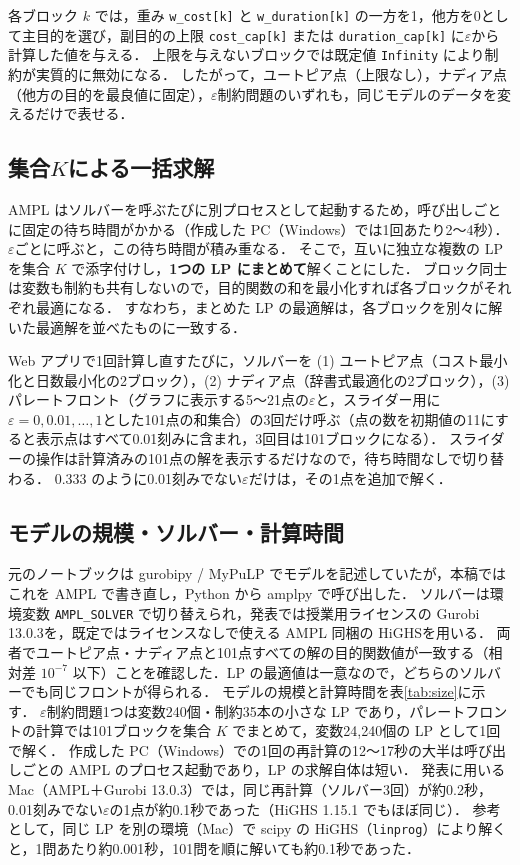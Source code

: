 \documentclass[a4paper,11pt]{ltjsarticle}
\begin{document}
各ブロック $k$ では，重み \texttt{w\_cost[k]} と \texttt{w\_duration[k]} の一方を1，他方を0として主目的を選び，副目的の上限 \texttt{cost\_cap[k]} または \texttt{duration\_cap[k]} に$\varepsilon$から計算した値を与える．
上限を与えないブロックでは既定値 \texttt{Infinity} により制約が実質的に無効になる．
したがって，ユートピア点（上限なし），ナディア点（他方の目的を最良値に固定），$\varepsilon$制約問題のいずれも，同じモデルのデータを変えるだけで表せる．

\subsection{集合\texorpdfstring{$K$}{K}による一括求解}
AMPL はソルバーを呼ぶたびに別プロセスとして起動するため，呼び出しごとに固定の待ち時間がかかる（作成した PC（Windows）では1回あたり2〜4秒）．$\varepsilon$ごとに呼ぶと，この待ち時間が積み重なる．
そこで，互いに独立な複数の LP を集合 $K$ で添字付けし，\textbf{1つの LP にまとめて}解くことにした．
ブロック同士は変数も制約も共有しないので，目的関数の和を最小化すれば各ブロックがそれぞれ最適になる．
すなわち，まとめた LP の最適解は，各ブロックを別々に解いた最適解を並べたものに一致する．

Web アプリで1回計算し直すたびに，ソルバーを (1) ユートピア点（コスト最小化と日数最小化の2ブロック），(2) ナディア点（辞書式最適化の2ブロック），(3) パレートフロント（グラフに表示する5〜21点の$\varepsilon$と，スライダー用に$\varepsilon=0, 0.01, \dots, 1$とした101点の和集合）の3回だけ呼ぶ（点の数を初期値の11にすると表示点はすべて0.01刻みに含まれ，3回目は101ブロックになる）．
スライダーの操作は計算済みの101点の解を表示するだけなので，待ち時間なしで切り替わる．
0.333 のように0.01刻みでない$\varepsilon$だけは，その1点を追加で解く．

\subsection{モデルの規模・ソルバー・計算時間}
元のノートブックは gurobipy / MyPuLP でモデルを記述していたが，本稿ではこれを AMPL で書き直し，Python から amplpy で呼び出した．
ソルバーは環境変数 \texttt{AMPL\_SOLVER} で切り替えられ，発表では授業用ライセンスの Gurobi 13.0.3\cite{gurobi}を，既定ではライセンスなしで使える AMPL 同梱の HiGHS\cite{highs}を用いる．
両者でユートピア点・ナディア点と101点すべての解の目的関数値が一致する（相対差 $10^{-7}$ 以下）ことを確認した．LP の最適値は一意なので，どちらのソルバーでも同じフロントが得られる．
モデルの規模と計算時間を表\ref{tab:size}に示す．
$\varepsilon$制約問題1つは変数240個・制約35本の小さな LP であり，パレートフロントの計算では101ブロックを集合 $K$ でまとめて，変数24,240個の LP として1回で解く．
作成した PC（Windows）での1回の再計算の12〜17秒の大半は呼び出しごとの AMPL のプロセス起動であり，LP の求解自体は短い．
発表に用いる Mac（AMPL＋Gurobi 13.0.3）では，同じ再計算（ソルバー3回）が約0.2秒，0.01刻みでない$\varepsilon$の1点が約0.1秒であった（HiGHS 1.15.1 でもほぼ同じ）．
参考として，同じ LP を別の環境（Mac）で scipy の HiGHS（\texttt{linprog}）により解くと，1問あたり約0.001秒，101問を順に解いても約0.1秒であった．
\end{document}
